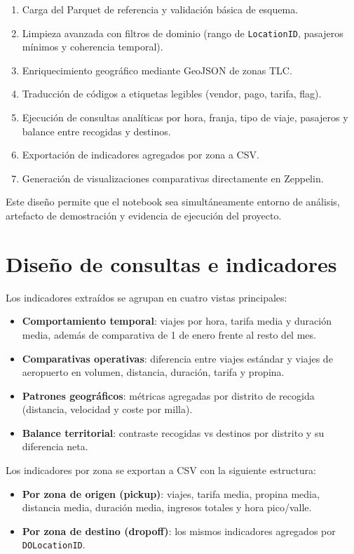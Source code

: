 \begin{enumerate}
	\item Carga del Parquet de referencia y validación básica de esquema.
	\item Limpieza avanzada con filtros de dominio (rango de
	\texttt{LocationID}, pasajeros mínimos y coherencia temporal).
	\item Enriquecimiento geográfico mediante GeoJSON de zonas TLC.
	\item Traducción de códigos a etiquetas legibles (vendor, pago, tarifa, flag).
	\item Ejecución de consultas analíticas por hora, franja, tipo de viaje,
	pasajeros y balance entre recogidas y destinos.
	\item Exportación de indicadores agregados por zona a CSV.
	\item Generación de visualizaciones comparativas directamente en Zeppelin.
\end{enumerate}

Este diseño permite que el notebook sea simultáneamente entorno de análisis,
artefacto de demostración y evidencia de ejecución del proyecto.

\section{Diseño de consultas e indicadores}
Los indicadores extraídos se agrupan en cuatro vistas principales:

\begin{itemize}
\item \textbf{Comportamiento temporal}: viajes por hora, tarifa media y duración
media, además de comparativa de 1 de enero frente al resto del mes.
\item \textbf{Comparativas operativas}: diferencia entre viajes estándar y viajes
de aeropuerto en volumen, distancia, duración, tarifa y propina.
\item \textbf{Patrones geográficos}: métricas agregadas por distrito de recogida
(distancia, velocidad y coste por milla).
\item \textbf{Balance territorial}: contraste recogidas vs destinos por distrito
y su diferencia neta.
\end{itemize}

Los indicadores por zona se exportan a CSV con la siguiente estructura:
\begin{itemize}
\item \textbf{Por zona de origen (pickup)}: viajes, tarifa media, propina media,
distancia media, duración media, ingresos totales y hora pico/valle.
\item \textbf{Por zona de destino (dropoff)}: los mismos indicadores agregados por
\texttt{DOLocationID}.
\end{itemize}

